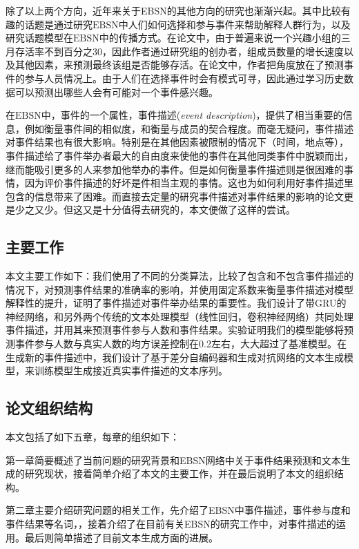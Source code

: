 \documentclass[]{template}
\begin{document}
除了以上两个方向，近年来关于EBSN的其他方向的研究也渐渐兴起。其中比较有趣的话题是通过研究$\mathrm{EBSN}$中人们如何选择和参与事件来帮助解释人群行为\cite{EBSN_understanding}，以及研究话题模型在$\mathrm{EBSN}$中的传播方式。在论文\cite{EBSN_can_i}中，由于普遍来说一个兴趣小组的三月存活率不到百分之30，因此作者通过研究组的创办者，组成员数量的增长速度以及其他因素，来预测最终该组是否能够存活。在论文\cite{EBSN_who_will}中，作者把角度放在了预测事件的参与人员情况上。由于人们在选择事件时会有模式可寻，因此通过学习历史数据可以预测出哪些人会有可能对一个事件感兴趣。

在$\mathrm{EBSN}$中，事件的一个属性，事件描述(\textit{event description})，提供了相当重要的信息，例如衡量事件间的相似度，和衡量与成员的契合程度。而毫无疑问，事件描述对事件结果也有很大影响。特别是在其他因素被限制的情况下（时间，地点等），事件描述给了事件举办者最大的自由度来使他的事件在其他同类事件中脱颖而出，继而能吸引更多的人来参加他举办的事件。但是如何衡量事件描述则是很困难的事情，因为评价事件描述的好坏是件相当主观的事情。这也为如何利用好事件描述里包含的信息带来了困难。而直接去定量的研究事件描述对事件结果的影响的论文更是少之又少。但这又是十分值得去研究的，本文便做了这样的尝试。

\subsection{主要工作}
本文主要工作如下：我们使用了不同的分类算法，比较了包含和不包含事件描述的情况下，对预测事件结果的准确率的影响，并使用固定系数来衡量事件描述对模型解释性的提升，证明了事件描述对事件举办结果的重要性。我们设计了带GRU的神经网络，和另外两个传统的文本处理模型（线性回归，卷积神经网络）共同处理事件描述，并用其来预测事件参与人数和事件结果。实验证明我们的模型能够将预测事件参与人数与真实人数的均方误差控制在0.2左右，大大超过了基准模型。在生成新的事件描述中，我们设计了基于差分自编码器和生成对抗网络的文本生成模型，来训练模型生成接近真实事件描述的文本序列。
\subsection{论文组织结构}
本文包括了如下五章，每章的组织如下：

第一章简要概述了当前问题的研究背景和EBSN网络中关于事件结果预测和文本生成的研究现状，接着简单介绍了本文的主要工作，并在最后说明了本文的组织结构。

第二章主要介绍研究问题的相关工作，先介绍了EBSN中事件描述，事件参与度和事件结果等名词，，接着介绍了在目前有关EBSN的研究工作中，对事件描述的运用。最后则简单描述了目前文本生成方面的进展。 
\end{document}
